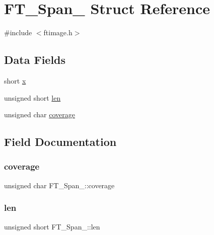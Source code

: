 \hypertarget{struct_f_t___span__}{}\section{F\+T\+\_\+\+Span\+\_\+ Struct Reference}
\label{struct_f_t___span__}


{\ttfamily \#include $<$ftimage.\+h$>$}

\subsection*{Data Fields}
\begin{DoxyCompactItemize}
\item 
short \hyperlink{struct_f_t___span___a7f7235a404c66398b49c50fa09691ba5}{x}
\item 
unsigned short \hyperlink{struct_f_t___span___a939c84317f25a97d0ba01704591a4d38}{len}
\item 
unsigned char \hyperlink{struct_f_t___span___a70f9c9e0e8d3f0b38adee03a508ae214}{coverage}
\end{DoxyCompactItemize}


\subsection{Field Documentation}
\mbox{\label{struct_f_t___span___a70f9c9e0e8d3f0b38adee03a508ae214}} 
\subsubsection{\texorpdfstring{coverage}{coverage}}
{\footnotesize\ttfamily unsigned char F\+T\+\_\+\+Span\+\_\+\+::coverage}

\mbox{\label{struct_f_t___span___a939c84317f25a97d0ba01704591a4d38}} 
\subsubsection{\texorpdfstring{len}{len}}
{\footnotesize\ttfamily unsigned short F\+T\+\_\+\+Span\+\_\+\+::len}

\mbox{\label{struct_f_t___span___a7f7235a404c66398b49c50fa09691ba5}} 
